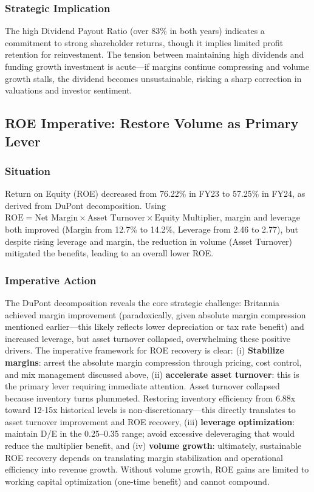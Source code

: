 \documentclass[12pt, a4paper]{report}
\begin{document}
\subsubsection{Strategic Implication}
The high Dividend Payout Ratio (over 83\% in both years) indicates a commitment to strong shareholder returns, though it implies limited profit retention for reinvestment. The tension between maintaining high dividends and funding growth investment is acute—if margins continue compressing and volume growth stalls, the dividend becomes unsustainable, risking a sharp correction in valuations and investor sentiment.

\subsection{ROE Imperative: Restore Volume as Primary Lever}

\subsubsection{Situation}
Return on Equity (ROE) decreased from 76.22\% in FY23 to 57.25\% in FY24, as derived from DuPont decomposition. Using $\text{ROE} = \text{Net Margin} \times \text{Asset Turnover} \times \text{Equity Multiplier}$, margin and leverage both improved (Margin from 12.7\% to 14.2\%, Leverage from 2.46 to 2.77), but despite rising leverage and margin, the reduction in volume (Asset Turnover) mitigated the benefits, leading to an overall lower ROE.

\subsubsection{Imperative Action}
The DuPont decomposition reveals the core strategic challenge: Britannia achieved margin improvement (paradoxically, given absolute margin compression mentioned earlier—this likely reflects lower depreciation or tax rate benefit) and increased leverage, but asset turnover collapsed, overwhelming these positive drivers. The imperative framework for ROE recovery is clear: (i) \textbf{Stabilize margins}: arrest the absolute margin compression through pricing, cost control, and mix management discussed above, (ii) \textbf{accelerate asset turnover}: this is the primary lever requiring immediate attention. Asset turnover collapsed because inventory turns plummeted. Restoring inventory efficiency from 6.88x toward 12-15x historical levels is non-discretionary—this directly translates to asset turnover improvement and ROE recovery, (iii) \textbf{leverage optimization}: maintain D/E in the 0.25–0.35 range; avoid excessive deleveraging that would reduce the multiplier benefit, and (iv) \textbf{volume growth}: ultimately, sustainable ROE recovery depends on translating margin stabilization and operational efficiency into revenue growth. Without volume growth, ROE gains are limited to working capital optimization (one-time benefit) and cannot compound.
\end{document}
